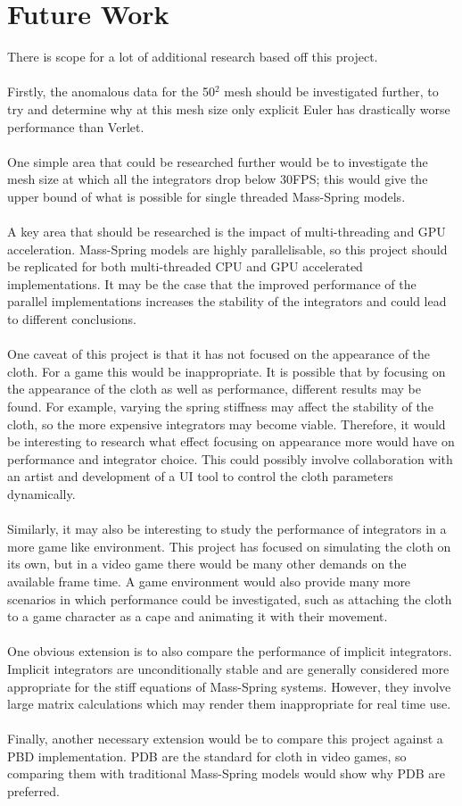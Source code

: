 \section{Future Work}
There is scope for a lot of additional research based off this project.
\\\\Firstly, the anomalous data for the 50$^{2}$ mesh should be investigated further, to try and determine why at this mesh size only explicit Euler has drastically worse performance than Verlet.
\\\\One simple area that could be researched further would be to investigate the mesh size at which all the integrators drop below 30FPS; this would give the upper bound of what is possible for single threaded Mass-Spring models.
\\\\A key area that should be researched is the impact of multi-threading and GPU acceleration. Mass-Spring models are highly parallelisable, so this project should be replicated for both multi-threaded CPU and GPU accelerated implementations. It may be the case that the improved performance of the parallel implementations increases the stability of the integrators and could lead to different conclusions.
\\\\One caveat of this project is that it has not focused on the appearance of the cloth. For a game this would be inappropriate. It is possible that by focusing on the appearance of the cloth as well as performance, different results may be found. For example, varying the spring stiffness may affect the stability of the cloth, so the more expensive integrators may become viable. Therefore, it would be interesting to research what effect focusing on appearance more would have on performance and integrator choice. This could possibly involve collaboration with an artist and development of a UI tool to control the cloth parameters dynamically.
\\\\Similarly, it may also be interesting to study the performance of integrators in a more game like environment. This project has focused on simulating the cloth on its own, but in a video game there would be many other demands on the available frame time. A game environment would also provide many more scenarios in which performance could be investigated, such as attaching the cloth to a game character as a cape and animating it with their movement.
\\\\One obvious extension is to also compare the performance of implicit integrators. Implicit integrators are unconditionally stable and are generally considered more appropriate for the stiff equations of Mass-Spring systems. However, they involve large matrix calculations which may render them inappropriate for real time use.
\\\\Finally, another necessary extension would be to compare this project against a PBD implementation. PDB are the standard for cloth in video games, so comparing them with traditional Mass-Spring models would show why PDB are preferred.